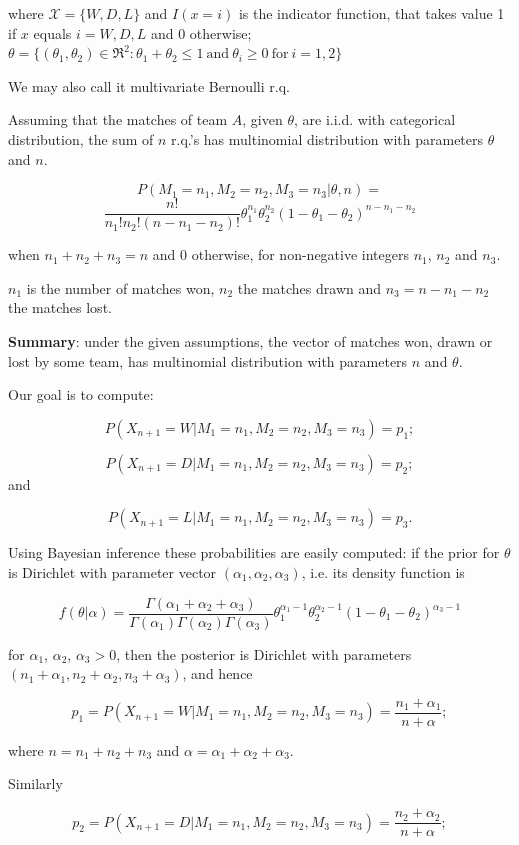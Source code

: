 \documentclass[journal,article,accept,moreauthors,pdftex,12pt,a4paper]{mdpi}
\begin{document}
\noindent
where $\mathcal{X}=\{W,D,L\}$ and $I(x=i)$ is the indicator function, that takes value 1 if $x$ equals $i= W, D, L$ and 0 otherwise; $\theta=\{(\theta_1,\theta_2)\in\Re^2:\theta_1+\theta_2\leq1 ~ \text{and} ~ \theta_i\geq0 ~ \text{for} ~ i=1, 2\}$

We may also call it multivariate Bernoulli r.q.

Assuming that the matches of team $A$, given $\theta$, are i.i.d. with categorical distribution, the sum of $n$ r.q.'s has multinomial distribution with parameters $\theta$ and $n$.

\[
P(M_1=n_1,M_2=n_2,M_3=n_3|\theta,n)=\]
\[
\frac{n!}{n_1!n_2!(n-n_1-n_2)!}\theta_1^{n_1}\theta_2^{n_2}(1-\theta_1-\theta_2)^{n-n_1-n_2}
\]

when $n_1+n_2+n_3=n$ and 0 otherwise, for non-negative integers $n_1$, $n_2$ and $n_3$.

$n_1$ is the number of matches won, $n_2$ the matches drawn and $n_3=n-n_1-n_2$ the matches lost.

{\bf Summary}: under the given assumptions, the vector of matches won, drawn or lost by some team, has multinomial distribution with parameters $n$ and $\theta$.

Our goal is to compute: 

\[P(X_{n+1}=W|M_1=n_1,M_2=n_2,M_3=n_3)=p_1;\]

\[P(X_{n+1}=D|M_1=n_1,M_2=n_2,M_3=n_3)=p_2;\] and

\[P(X_{n+1}=L|M_1=n_1,M_2=n_2,M_3=n_3)=p_3.\]


Using Bayesian inference these probabilities are easily computed: if the prior for $\theta$ is Dirichlet with parameter vector $(\alpha_1,\alpha_2,\alpha_3)$, i.e. its density function is

\[
f(\theta|\alpha)=\frac{\Gamma(\alpha_1+\alpha_2+\alpha_3)}{\Gamma(\alpha_1)\Gamma(\alpha_2)\Gamma(\alpha_3)}\theta_1^{\alpha_1-1}\theta_2^{\alpha_2-1}(1-\theta_1-\theta_2)^{\alpha_3-1}
\]

\noindent
for $\alpha_1$, $\alpha_2$, $\alpha_3 > 0$, then the posterior is Dirichlet with parameters $(n_1+\alpha_1,n_2+\alpha_2,n_3+\alpha_3)$, and hence

\[p_1=P(X_{n+1}=W|M_1=n_1,M_2=n_2,M_3=n_3)=\frac{n_1+\alpha_1}{n+\alpha};\]

\noindent
where $n=n_1+n_2+n_3$ and $\alpha=\alpha_1+\alpha_2+\alpha_3$.

Similarly

\[p_2=P(X_{n+1}=D|M_1=n_1,M_2=n_2,M_3=n_3)=\frac{n_2+\alpha_2}{n+\alpha};\]
\end{document}
